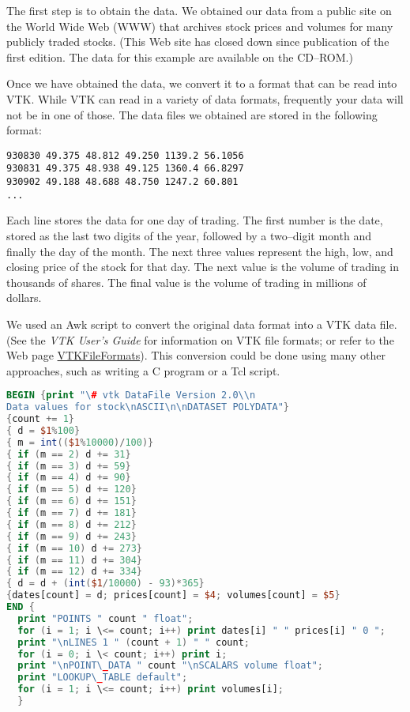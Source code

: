 The first step is to obtain the data. We obtained our data from a public site on the World Wide Web (WWW) that archives stock prices and volumes for many publicly traded stocks. (This Web site has closed down since publication of the first edition. The data for this example are available on the CD--ROM.)

Once we have obtained the data, we convert it to a format that can be read into VTK. While VTK can read in a variety of data formats, frequently your data will not be in one of those. The data files we obtained are stored in the following format:

\begin{lstlisting}[numbers=none]
930830 49.375 48.812 49.250 1139.2 56.1056
930831 49.375 48.938 49.125 1360.4 66.8297
930902 49.188 48.688 48.750 1247.2 60.801
...
\end{lstlisting}

Each line stores the data for one day of trading. The first number is the date, stored as the last two digits of the year, followed by a two--digit month and finally the day of the month. The next three values represent the high, low, and closing price of the stock for that day. The next value is the volume of trading in thousands of shares. The final value is the volume of trading in millions of dollars.

We used an Awk script to convert the original data format into a VTK data file. (See the \emph{VTK User's Guide} for information on VTK file formats; or refer to the Web page \href{https://lorensen.github.io/VTKExamples/site/VTKFileFormats/}{VTKFileFormats}). This conversion could be done using many other approaches, such as writing a C program or a Tcl script.

\begin{lstlisting}[language=Awk, caption={Awk: converting data file to VTK.}]
BEGIN {print "\# vtk DataFile Version 2.0\\n
Data values for stock\nASCII\n\nDATASET POLYDATA"}
{count += 1}
{ d = $1%100}
{ m = int(($1%10000)/100)}
{ if (m == 2) d += 31}
{ if (m == 3) d += 59}
{ if (m == 4) d += 90}
{ if (m == 5) d += 120}
{ if (m == 6) d += 151}
{ if (m == 7) d += 181}
{ if (m == 8) d += 212}
{ if (m == 9) d += 243}
{ if (m == 10) d += 273}
{ if (m == 11) d += 304}
{ if (m == 12) d += 334}
{ d = d + (int($1/10000) - 93)*365}
{dates[count] = d; prices[count] = $4; volumes[count] = $5}
END {
  print "POINTS " count " float";
  for (i = 1; i \<= count; i++) print dates[i] " " prices[i] " 0 ";
  print "\nLINES 1 " (count + 1) " " count;
  for (i = 0; i \< count; i++) print i;
  print "\nPOINT\_DATA " count "\nSCALARS volume float";
  print "LOOKUP\_TABLE default";
  for (i = 1; i \<= count; i++) print volumes[i];
  }
\end{lstlisting}

